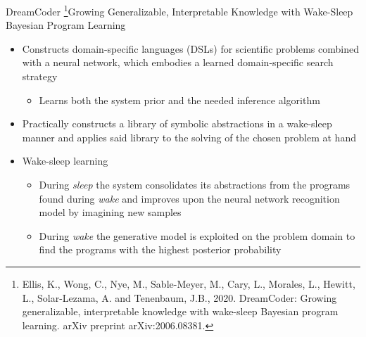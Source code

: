 \documentclass[AERbeamer%
              ,optEnglish%
              ,optBiber%
              ,optBibstyleAlphabetic%
              ,optBeamerClassicFormat%
              ]{AERlatex}%
\begin{document}
\begin{frame}[c]{DreamCoder \footnote{Ellis, K., Wong, C., Nye, M., Sable-Meyer, M., Cary, L., Morales, L., Hewitt, L., Solar-Lezama, A. and Tenenbaum, J.B., 2020. DreamCoder: Growing generalizable, interpretable knowledge with wake-sleep Bayesian program learning. arXiv preprint arXiv:2006.08381.}}{Growing Generalizable, Interpretable Knowledge with Wake-Sleep Bayesian Program Learning}
    \centering
    \begin{itemize}
        \item Constructs domain-specific languages (DSLs) for scientific problems combined with a neural network,
              which embodies a learned domain-specific search strategy
        \begin{itemize}
            \item Learns both the system prior and the needed inference algorithm
        \end{itemize}
        \item Practically constructs a library of symbolic abstractions in a wake-sleep manner and applies said library
              to the solving of the chosen problem at hand
        \item Wake-sleep learning %
        \begin{itemize}
            \item During \textit{sleep} the system consolidates its abstractions from the programs found during \textit{wake}
                  and improves upon the neural network recognition model by imagining new samples
            \item During \textit{wake} the generative model is exploited on the problem domain to find the programs with the
                  highest posterior probability
        \end{itemize}
    \end{itemize}
\end{frame}
\end{document}
